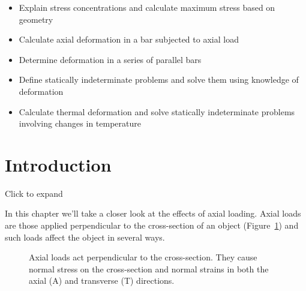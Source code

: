 \documentclass[
  letterpaper,
  DIV=11,
  numbers=noendperiod]{scrreprt}
\providecommand{\tightlist}{%
  \setlength{\itemsep}{0pt}\setlength{\parskip}{0pt}}\usepackage{longtable,booktabs,array}
\theoremstyle{definition}
\theoremstyle{remark}
\begin{document}
\begin{tcolorbox}[enhanced jigsaw, left=2mm, toptitle=1mm, breakable, coltitle=black, colbacktitle=quarto-callout-note-color!10!white, opacitybacktitle=0.6, bottomrule=.15mm, titlerule=0mm, leftrule=.75mm, colframe=quarto-callout-note-color-frame, bottomtitle=1mm, opacityback=0, title={Learning Objectives}, arc=.35mm, colback=white, rightrule=.15mm, toprule=.15mm]

\begin{itemize}
\tightlist
\item
  Explain stress concentrations and calculate maximum stress based on
  geometry
\item
  Calculate axial deformation in a bar subjected to axial load
\item
  Determine deformation in a series of parallel bars
\item
  Define statically indeterminate problems and solve them using
  knowledge of deformation
\item
  Calculate thermal deformation and solve statically indeterminate
  problems involving changes in temperature
\end{itemize}

\end{tcolorbox}

\section*{Introduction}\label{introduction-4}


Click to expand

In this chapter we'll take a closer look at the effects of axial
loading. Axial loads are those applied perpendicular to the
cross-section of an object (Figure~\ref{fig-5.1}) and such loads affect
the object in several ways.

\begin{figure}


\caption{\label{fig-5.1}Axial loads act perpendicular to the
cross-section. They cause normal stress on the cross-section and normal
strains in both the axial (A) and transverse (T) directions.}

\end{figure}%
\end{document}
